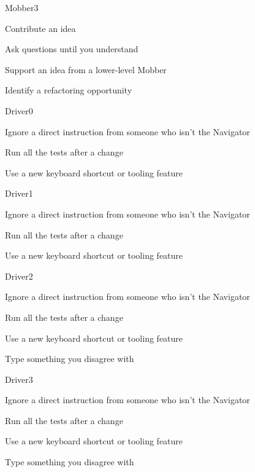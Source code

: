 \documentclass[letterpaper,20pt]{extarticle}
\begin{document}
\begin{role}{Mobber}{3}
  \item Contribute an idea
  \item Ask questions until you understand
  \item Support an idea from a lower-level Mobber
  \item Identify a refactoring opportunity
\end{role}


\renewcommand{\blurb}{Write code according to the Navigator's directions}

\begin{role}{Driver}{0}
  \item Ignore a direct instruction from someone who isn't the Navigator
  \item Run all the tests after a change
  \item Use a new keyboard shortcut or tooling feature
\end{role}

\begin{role}{Driver}{1}
  \item Ignore a direct instruction from someone who isn't the Navigator
  \item Run all the tests after a change
  \item Use a new keyboard shortcut or tooling feature
\end{role}

\begin{role}{Driver}{2}
  \item Ignore a direct instruction from someone who isn't the Navigator
  \item Run all the tests after a change
  \item Use a new keyboard shortcut or tooling feature
  \item Type something you disagree with
\end{role}

\begin{role}{Driver}{3}
  \item Ignore a direct instruction from someone who isn't the Navigator
  \item Run all the tests after a change
  \item Use a new keyboard shortcut or tooling feature
  \item Type something you disagree with
\end{role}
\end{document}
